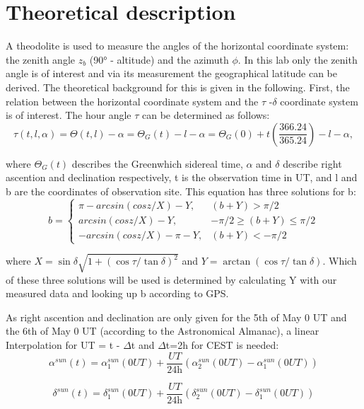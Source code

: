 
\chapter{Theoretical description}
\label{chap:fvz}

A theodolite is used to measure the angles of the horizontal coordinate system: the zenith angle $z_b$ (90° - altitude) and the azimuth $\phi$. In this lab only the zenith angle is of interest and via its measurement the geographical latitude can be derived. The theoretical background for this is given in the following. First, the relation between the horizontal coordinate system and the $\tau$ -$\delta$ coordinate system is of interest. The hour angle $\tau$ can be determined as follows:
\begin{equation}
    \tau (t, l, \alpha)= \Theta (t, l) - \alpha = \Theta_G(t) - l - \alpha = \Theta_G(0) + t  \left( \frac{366.24}{365.24}\right) - l - \alpha, 
\end{equation}

where $\Theta_G(t)$ describes the Greenwhich sidereal time, $\alpha$ and $\delta$ describe right ascention and declination respectively, t is the observation time in UT, and l and b are the coordinates of observation site. This equation has three solutions for b:
\[
b = 
\begin{cases}
    \pi - arcsin(cos z/X) - Y, & (b + Y ) > \pi/2 \\
    arcsin(cos z/X) - Y, & -\pi/2 \ge (b + Y ) \le \pi/2 \\
    -arcsin(cos z/X) - \pi - Y, & (b + Y ) < - \pi/2
\end{cases}
\]

where $X = \sin \delta \sqrt{1+(\cos \tau / \tan \delta)^2}$ and $Y = \arctan(\cos \tau / \tan \delta)$. Which of these three solutions will be used is determined by calculating Y with our measured data and looking up b according to GPS. 

As right ascention and declination are only given for the 5th of May 0 UT and the 6th of May 0 UT (according to the Astronomical Almanac), a linear Interpolation for UT = t - $\Delta$t and $\Delta$t=2h for CEST is needed:
\begin{equation}
    \alpha^{sun}(t) = \alpha^{sun}_1(0UT) + \frac{UT}{\text{24h}}(\alpha^{sun}_2(0UT)-\alpha^{sun}_1(0UT))
\end{equation}

\begin{equation}
    \delta^{sun}(t) = \delta^{sun}_1(0UT) + \frac{UT}{\text{24h}}(\delta^{sun}_2(0UT)-\delta^{sun}_1(0UT))
\end{equation}


